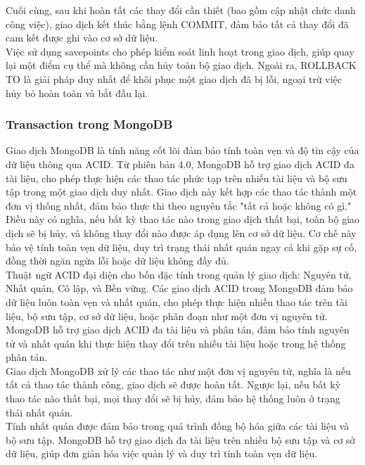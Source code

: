 Cuối cùng, sau khi hoàn tất các thay đổi cần thiết (bao gồm cập nhật chức danh công việc), giao dịch kết thúc bằng lệnh COMMIT, đảm bảo tất cả thay đổi đã cam kết được ghi vào cơ sở dữ liệu.\\

Việc sử dụng savepoints cho phép kiểm soát linh hoạt trong giao dịch, giúp quay lại một điểm cụ thể mà không cần hủy toàn bộ giao dịch. Ngoài ra, ROLLBACK TO là giải pháp duy nhất để khôi phục một giao dịch đã bị lỗi, ngoại trừ việc hủy bỏ hoàn toàn và bắt đầu lại.\\

\subsubsection{Transaction trong MongoDB}
\indent Giao dịch MongoDB là tính năng cốt lõi đảm bảo tính toàn vẹn và độ tin cậy của dữ liệu thông qua ACID. Từ phiên bản 4.0, MongoDB hỗ trợ giao dịch ACID đa tài liệu, cho phép thực hiện các thao tác phức tạp trên nhiều tài liệu và bộ sưu tập trong một giao dịch duy nhất. Giao dịch này kết hợp các thao tác thành một đơn vị thống nhất, đảm bảo thực thi theo nguyên tắc "tất cả hoặc không có gì."\\

Điều này có nghĩa, nếu bất kỳ thao tác nào trong giao dịch thất bại, toàn bộ giao dịch sẽ bị hủy, và không thay đổi nào được áp dụng lên cơ sở dữ liệu. Cơ chế này bảo vệ tính toàn vẹn dữ liệu, duy trì trạng thái nhất quán ngay cả khi gặp sự cố, đồng thời ngăn ngừa lỗi hoặc dữ liệu không đầy đủ.\\

Thuật ngữ ACID đại diện cho bốn đặc tính trong quản lý giao dịch: Nguyên tử, Nhất quán, Cô lập, và Bền vững. Các giao dịch ACID trong MongoDB đảm bảo dữ liệu luôn toàn vẹn và nhất quán, cho phép thực hiện nhiều thao tác trên tài liệu, bộ sưu tập, cơ sở dữ liệu, hoặc phân đoạn như một đơn vị nguyên tử. MongoDB hỗ trợ giao dịch ACID đa tài liệu và phân tán, đảm bảo tính nguyên tử và nhất quán khi thực hiện thay đổi trên nhiều tài liệu hoặc trong hệ thống phân tán.\\

Giao dịch MongoDB xử lý các thao tác như một đơn vị nguyên tử, nghĩa là nếu tất cả thao tác thành công, giao dịch sẽ được hoàn tất. Ngược lại, nếu bất kỳ thao tác nào thất bại, mọi thay đổi sẽ bị hủy, đảm bảo hệ thống luôn ở trạng thái nhất quán.\\

Tính nhất quán được đảm bảo trong quá trình đồng bộ hóa giữa các tài liệu và bộ sưu tập. MongoDB hỗ trợ giao dịch đa tài liệu trên nhiều bộ sưu tập và cơ sở dữ liệu, giúp đơn giản hóa việc quản lý và duy trì tính toàn vẹn dữ liệu.\\

